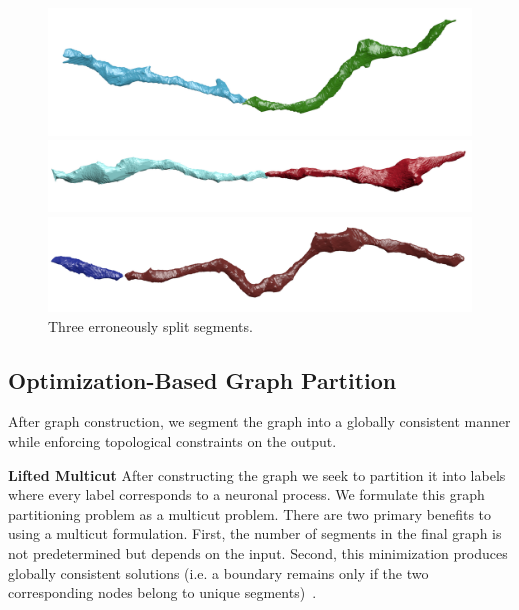 \begin{figure}[t]
	\centering
	\begin{minipage}{0.32\linewidth}
		\includegraphics[width=\linewidth]{./figures/split_error1.png}		
	\end{minipage}
	\hfill
	\begin{minipage}{0.32\linewidth}
		\includegraphics[width=\linewidth]{./figures/split_error2.png}				
	\end{minipage}
	\hfill
	\begin{minipage}{0.32\linewidth}
		\includegraphics[width=\linewidth]{./figures/split_error3.png}
	\end{minipage}
	\caption{Three erroneously split segments.}
	\label{fig:merge_candidates}
\end{figure}
\subsection{Optimization-Based Graph Partition}

After graph construction, we segment the graph into a globally consistent manner while enforcing topological constraints on the output.

\noindent\textbf{Lifted Multicut}
After constructing the graph we seek to partition it into labels where every label corresponds to a neuronal process. 
We formulate this graph partitioning problem as a multicut problem.
There are two primary benefits to using a multicut formulation. 
First, the number of segments in the final graph is not predetermined but depends on the input. 
Second, this minimization produces globally consistent solutions (i.e. a boundary remains only if the two corresponding nodes belong to unique segments)~\cite{keuper2015efficient}.

